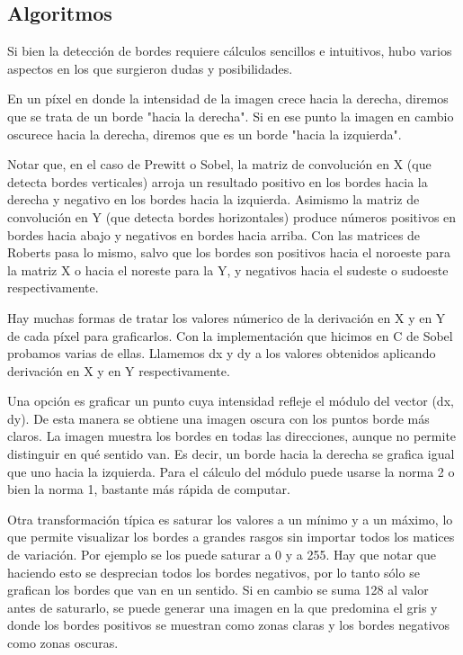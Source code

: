 \subsection{Algoritmos}
Si bien la detección de bordes requiere cálculos sencillos e intuitivos, hubo varios aspectos en los que surgieron dudas y posibilidades.

En un píxel en donde la intensidad de la imagen crece hacia la derecha, diremos que se trata de un borde "hacia la derecha". Si en ese punto la imagen en cambio oscurece hacia la derecha, diremos que es un borde "hacia la izquierda".

Notar que, en el caso de Prewitt o Sobel, la matriz de convolución en X (que detecta bordes verticales) arroja un resultado positivo en los bordes hacia la derecha y negativo en los bordes hacia la izquierda. Asimismo la matriz de convolución en Y (que detecta bordes horizontales) produce números positivos en bordes hacia abajo y negativos en bordes hacia arriba. Con las matrices de Roberts pasa lo mismo, salvo que los bordes son positivos hacia el noroeste para la matriz X o hacia el noreste para la Y, y negativos hacia el sudeste o sudoeste respectivamente.

Hay muchas formas de tratar los valores númerico de la derivación en X y en Y de cada píxel para graficarlos. Con la implementación que hicimos en C de Sobel probamos varias de ellas. Llamemos dx y dy a los valores obtenidos aplicando derivación en X y en Y respectivamente.

Una opción es graficar un punto cuya intensidad refleje el módulo del vector (dx, dy). De esta manera se obtiene una imagen oscura con los puntos borde más claros. La imagen muestra los bordes en todas las direcciones, aunque no permite distinguir en qué sentido van. Es decir, un borde hacia la derecha se grafica igual que uno hacia la izquierda. Para el cálculo del módulo puede usarse la norma 2 o bien la norma 1, bastante más rápida de computar.

Otra transformación típica es saturar los valores a un mínimo y a un máximo, lo que permite visualizar los bordes a grandes rasgos sin importar todos los matices de variación. Por ejemplo se los puede saturar a 0 y a 255. Hay que notar que haciendo esto se desprecian todos los bordes negativos, por lo tanto sólo se grafican los bordes que van en un sentido. Si en cambio se suma 128 al valor antes de saturarlo, se puede generar una imagen en la que predomina el gris y donde los bordes positivos se muestran como zonas claras y los bordes negativos como zonas oscuras.

